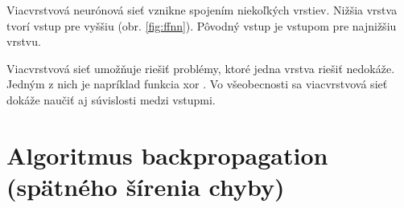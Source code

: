 Viacvrstvová neurónová sieť vznikne spojením niekoľkých vrstiev. Nižšia vrstva tvorí vstup pre vyššiu (obr. \ref{fig:ffnn}). Pôvodný vstup je vstupom pre najnižšiu vrstvu.

Viacvrstvová sieť umožňuje riešiť problémy, ktoré jedna vrstva riešiť nedokáže. Jedným z nich je napríklad funkcia xor \cite[s. 197]{haykin1999neural}. Vo všeobecnosti sa viacvrstvová sieť dokáže naučiť aj súvislosti medzi vstupmi.

\section{Algoritmus backpropagation (spätného šírenia chyby)}

